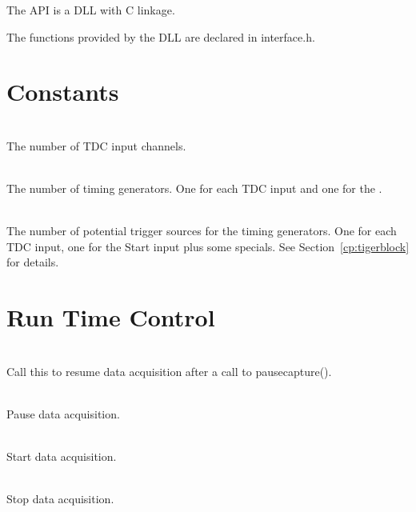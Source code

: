 The API is a DLL with C linkage.\par

The functions provided by the DLL are declared in \textsf{\tu interface.h}.

\section{Constants}

	\\
	The number of TDC input channels.\par

	 \\
	The number of timing generators. One for each TDC input and one for the .\par

	 \\
	The number of potential trigger sources for the timing generators. One for each TDC input, one for the Start input plus some specials. 
	 See Section~\ref{cp:tigerblock} for details.\par


\section{Run Time Control}

	 \\
	 Call this to resume data acquisition after a call to \textsf{\prefix pause\tu capture()}.\par

	 \\
	 Pause data acquisition.\par

	 \\
	 Start data acquisition.\par

	 \\
	 Stop data acquisition.\par



